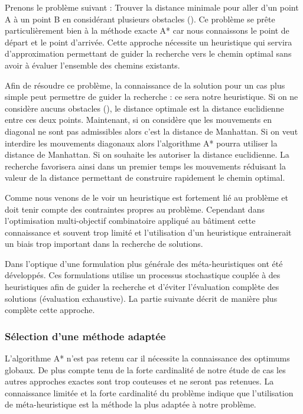 Prenons le problème suivant : Trouver la distance minimale pour aller d’un point A à un point B
en considérant plusieurs obstacles ().
Ce problème se prête particulièrement bien à la méthode exacte A* car nous connaissons
le point de départ et le point d’arrivée. Cette approche nécessite un heuristique
qui servira d’approximation permettant de guider la recherche vers le chemin optimal
sans avoir à évaluer l’ensemble des chemins existants.

Afin de résoudre ce problème, la connaissance de la solution pour un cas plus simple
peut permettre de guider la recherche : ce sera notre heuristique.
Si on ne considère aucuns obstacles (), le distance optimale
est la distance euclidienne entre ces deux points. Maintenant, si on considère que
les mouvements en diagonal ne sont pas admissibles alors c’est la distance de Manhattan.
Si on veut interdire les mouvements diagonaux alors l’algorithme A* pourra utiliser
la distance de Manhattan. Si on souhaite les autoriser la distance euclidienne.
La recherche favorisera ainsi dans un premier temps les mouvements réduisant la
valeur de la distance permettant de construire rapidement le chemin optimal.


Comme nous venons de le voir un heuristique est fortement lié au problème et doit tenir
compte des contraintes propres au problème. Cependant dans l’optimisation multi-objectif combinatoire
appliqué au bâtiment cette connaissance et souvent trop limité et l’utilisation
d’un heuristique entrainerait un biais trop important dans la recherche de solutions.

Dans l’optique d’une formulation plus générale des méta-heuristiques ont été développés.
Ces formulations utilise un processus stochastique couplée à des heuristiques afin de guider
la recherche et d’éviter l’évaluation complète des solutions (évaluation exhaustive). La partie
suivante décrit de manière plus complète cette approche.

\subsubsection{Sélection d’une méthode adaptée} %
\label{ssub:selection_d_une_methode_adaptee}
L’algorithme A* n’est pas retenu car il nécessite la connaissance des optimums globaux.
De plus compte tenu de la forte cardinalité de notre étude de cas les autres approches exactes
sont trop couteuses et ne seront pas retenues.
La connaissance limitée et la forte cardinalité du problème indique que l’utilisation
de méta-heuristique est la méthode la plus adaptée à notre problème.

